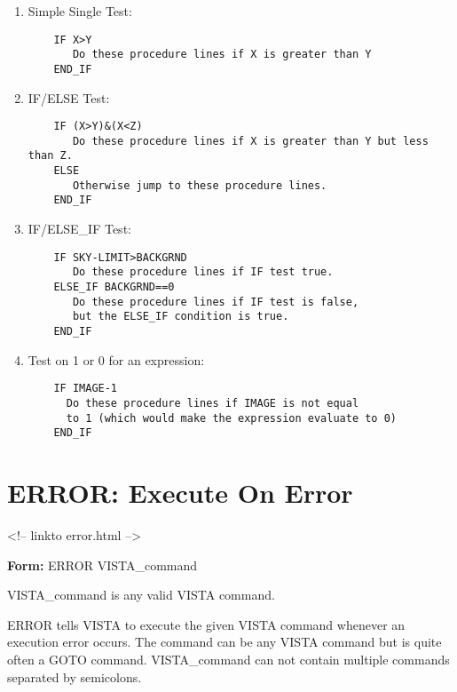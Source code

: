 \begin{enumerate}
  \item Simple Single Test:
  \begin{verbatim}
    IF X>Y
       Do these procedure lines if X is greater than Y
    END_IF
  \end{verbatim}

  \item IF/ELSE Test:
  \begin{verbatim}
    IF (X>Y)&(X<Z)
       Do these procedure lines if X is greater than Y but less than Z.
    ELSE
       Otherwise jump to these procedure lines.
    END_IF
  \end{verbatim}

  \item IF/ELSE\_IF Test:
  \begin{verbatim}
    IF SKY-LIMIT>BACKGRND
       Do these procedure lines if IF test true.
    ELSE_IF BACKGRND==0
       Do these procedure lines if IF test is false, 
       but the ELSE_IF condition is true.
    END_IF
  \end{verbatim}

  \item Test on 1 or 0 for an expression:
  \begin{verbatim}
    IF IMAGE-1
      Do these procedure lines if IMAGE is not equal
      to 1 (which would make the expression evaluate to 0)
    END_IF
  \end{verbatim}

\end{enumerate}

\section{ERROR: Execute On Error}
\begin{rawhtml}
<!-- linkto error.html -->
\end{rawhtml}

\begin{command}
  \item[\textbf{Form: } ERROR  VISTA\_command\hfill]{}
  \item[VISTA\_command]{is any valid VISTA command.}
\end{command}
ERROR tells VISTA to execute the given VISTA command whenever an execution
error occurs.  The command can be any VISTA command but is quite often a
GOTO command.  VISTA\_command can not contain multiple commands separated
by semicolons.

